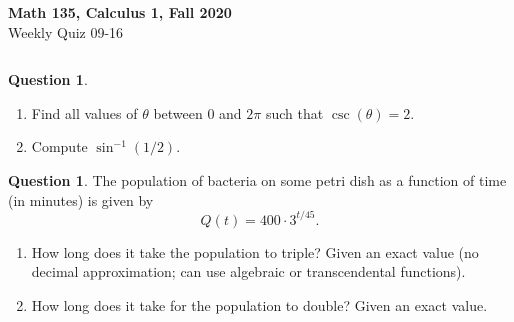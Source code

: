 \documentclass[11pt,reqno,final]{amsart}
\numberwithin{equation}{section}
\numberwithin{figure}{section}
\theoremstyle{definition} %
\newtheorem{question}[exercise]{Question}
\begin{document}
\begin{center}
        \textbf{\Large Math 135, Calculus 1, Fall 2020}\\[10pt]
        {\large Weekly Quiz 09-16}
\end{center}

\thispagestyle{empty}

\renewcommand{\thesection}{\Alph{section}}

$ $

\begin{question}
        \begin{enumerate}
        \item Find all values of $\theta$ between $0$ and $2\pi$ such that $\csc(\theta) = 2$.
                \vfill
        \item Compute $\sin^{-1}(1/2)$.
                \vfill
        \end{enumerate}
\end{question}

\begin{question}
        The population of bacteria on some petri dish as a function of time (in minutes) is given by
        \[
                Q(t) = 400 \cdot 3^{t/45}.
        \]
        \begin{enumerate}
        \item How long does it take the population to triple? Given an exact value (no decimal approximation; can use algebraic or transcendental functions).
                \vfill
        \item How long does it take for the population to double? Given an exact value.
                \vfill
        \end{enumerate}
\end{question}
\end{document}
